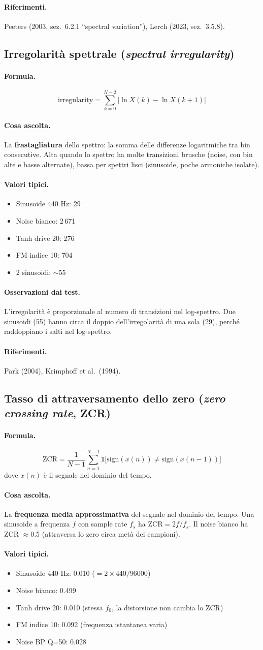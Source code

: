 \documentclass[a4paper,11pt]{article}
\newcommand{\desc}[1]{\subsection{#1}}
\newcommand{\formula}{\paragraph{Formula.}}
\newcommand{\ascolta}{\paragraph{Cosa ascolta.}}
\newcommand{\range}{\paragraph{Valori tipici.}}
\newcommand{\rif}{\paragraph{Riferimenti.}}
\newcommand{\oss}{\paragraph{Osservazioni dai test.}}
\begin{document}
\rif Peeters (2003, sez.~6.2.1 ``spectral variation''), Lerch (2023, sez.~3.5.8).

\desc{Irregolarità spettrale (\emph{spectral irregularity})}

\formula
\[
  \text{irregularity} = \sum_{k=0}^{N-2} \big| \ln X(k) - \ln X(k+1) \big|
\]

\ascolta
La \textbf{frastagliatura} dello spettro: la somma delle differenze
logaritmiche tra bin consecutive. Alta quando lo spettro ha molte
transizioni brusche (noise, con bin alte e basse alternate), bassa
per spettri lisci (sinusoide, poche armoniche isolate).

\range
\begin{itemize}[nosep]
  \item Sinusoide 440 Hz: 29
  \item Noise bianco: 2\,671
  \item Tanh drive 20: 276
  \item FM indice 10: 704
  \item 2 sinusoidi: $\sim$55
\end{itemize}

\oss L'irregolarità è proporzionale al numero di transizioni nel log-spettro.
Due sinusoidi (55) hanno circa il doppio dell'irregolarità di una sola (29),
perché raddoppiano i salti nel log-spettro.

\rif Park (2004), Krimphoff et al.\ (1994).

\desc{Tasso di attraversamento dello zero (\emph{zero crossing rate}, ZCR)}

\formula
\[
  \text{ZCR} = \frac{1}{N-1} \sum_{n=1}^{N-1}
    \mathbb{1}\!\big[\text{sign}(x(n)) \neq \text{sign}(x(n-1))\big]
\]
dove $x(n)$ è il segnale nel dominio del tempo.

\ascolta
La \textbf{frequenza media approssimativa} del segnale nel dominio del
tempo. Una sinusoide a frequenza $f$ con sample rate $f_s$ ha
$\text{ZCR} = 2f/f_s$. Il noise bianco ha ZCR $\approx 0.5$
(attraversa lo zero circa metà dei campioni).

\range
\begin{itemize}[nosep]
  \item Sinusoide 440 Hz: 0.010 ($= 2 \times 440 / 96000$)
  \item Noise bianco: 0.499
  \item Tanh drive 20: 0.010 (stessa $f_0$, la distorsione non cambia lo ZCR)
  \item FM indice 10: 0.092 (frequenza istantanea varia)
  \item Noise BP Q=50: 0.028
\end{itemize}
\end{document}
